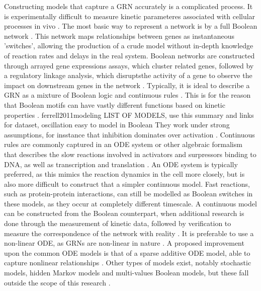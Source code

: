 \documentclass[../main.tex]{subfiles}
\begin{document}
Constructing models that capture a GRN accurately is a complicated process.
It is experimentally difficult to measure kinetic parameteres associated with cellular processes in vivo \cite{bolouri2002modeling}.
The most basic way to represent a network is by a full Boolean network \cite{bolouri2002modeling}.
This network maps relationships between genes as instantaneous 'switches', allowing the production of a crude model without in-depth knowledge of reaction rates and delays in the real system.
Boolean networks are constructed through arrayed gene expressions assays, which cluster related genes, followed by a regulatory linkage analysis, which disruptsthe activity of a gene to observe the impact on downstream genes in the network \cite{bolouri2002modeling, wu2013high}.
Typically, it is ideal to describe a GRN as a mixture of Boolean logic and continuous rules \cite{bolouri2002modeling}.
This is for the reason that Boolean motifs can have vastly different functions based on kinetic properties \cite{ingram2006network}.
ferrell2011modeling LIST OF MODELS, use this summary and links for dataset, oscillation easy to model in Boolean
They work under strong assumptions, for insstance that inhibition dominates over activation \cite{}.
Continuous rules are commonly captured in an ODE system or other algebraic formalism that describes the slow reactions involved in activators and surpressors binding to DNA, as well as transcription and translation \cite{ingram2006network}.
An ODE system is typically preferred, as this mimics the reaction dynamics in the cell more closely, but is also more difficult to construct that a simpler continuous model.
Fast reactions, such as protein-protein interactions, can still be modelled as Boolean switches in these models, as they occur at completely different timescale.
A continuous model can be constructed  from the Boolean counterpart, when additional research is done through the measurement of kinetic data, followed by verification to measure the correspondence of the network with reality \cite{bolouri2002modeling}.
It is preferable to use a non-linear ODE, as GRNs are non-linear in nature \cite{qian2008inference, tyson2003sniffers}.
A proposed improvement upon the common ODE models is that of a sparse additive ODE model, able to capture nonlinear relationships \cite{wu2014sparse}.
Other types of models exist, notably stochastic models, hidden Markov models and multi-values Boolean models, but these fall outside the scope of this research \cite{bolouri2002modeling, wu2014sparse}.
\end{document}
